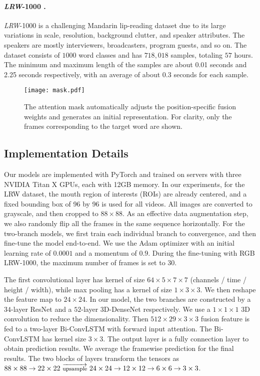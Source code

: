 \documentclass{bmvc2k}
\begin{document}
\paragraph{\textit{LRW}-1000 \cite{yang2018lrw}.}\textit{LRW}-1000 is a challenging Mandarin lip-reading dataset due to its large variations in scale, resolution, background clutter, and speaker attributes. The speakers are mostly interviewers, broadcasters, program guests, and so on. The dataset consists of $1000$ word classes and has $718,018$ samples, totaling $57$ hours. The minimum and maximum length of the samples are about 0.01 seconds and 2.25 seconds respectively, with an average of about 0.3 seconds for each sample.

\begin{figure*}
  \centering
  \centerline{\texttt{[image: mask.pdf]}}
\caption{The attention mask automatically adjusts the position-specific fusion weights and generates an initial representation. For clarity, only the frames corresponding to the target word are shown.}
\label{fig:mask}
\vspace{-1em}
\end{figure*}
\vspace{-1em}
\subsection{Implementation Details}
Our models are implemented with PyTorch and trained on servers with three NVIDIA Titan X GPUs, each with 12GB memory. In our experiments, for the LRW dataset, the mouth region of interests (ROIs) are already centered, and a fixed bounding box of 96 by 96 is used for all videos. All images are converted to grayscale, and then cropped to $88\times 88$. As an effective data augmentation step, we also randomly flip all the frames in the same sequence horizontally. For the two-branch models, we first train each individual branch to convergence, and then fine-tune the model end-to-end. We use the Adam optimizer with an initial learning rate of $0.0001$ and a momentum of $0.9$. During the fine-tuning with RGB LRW-1000, the maximum number of frames is set to $30$.

The first convolutional layer has kernel of size $64\times5\times7\times7$ (channels / time / height / width), while max pooling has a kernel of size $1\times3\times3$. We then reshape the feature map to $24\times24$.
In our model, the two branches are constructed by
 a $34$-layer ResNet and a $52$-layer 3D-DenseNet \cite{yang2018lrw} respectively. We use a $1\times1\times1$ 3D convolution to reduce the dimensionality. Then $512\times29\times3\times3$ fusion feature is fed to a two-layer Bi-ConvLSTM with forward input attention. The Bi-ConvLSTM has kernel size $3\times3$. The output layer is a fully connection layer to obtain prediction results. We average the framewise prediction for the final results. The two blocks of layers transform the tensors as $88\times88 \rightarrow 22\times22 ~\overrightarrow{\text{\footnotesize upsample}}~ 24\times24 \rightarrow 12\times12 \rightarrow 6\times6 \rightarrow 3\times3$.
\end{document}
